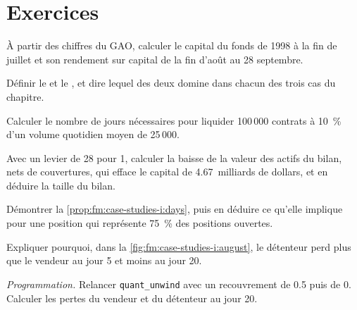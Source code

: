 \section{Exercices}

\begin{exercise}[$\star$]\label{exo:fm:case-studies-i:1}
À partir des chiffres du GAO, calculer le capital du fonds de 1998 à la fin de juillet et son rendement sur capital de la fin d'août au 28 septembre.
\end{exercise}

\begin{exercise}[$\star$]\label{exo:fm:case-studies-i:2}
Définir le  et le , et dire lequel des deux domine dans chacun des trois cas du chapitre.
\end{exercise}

\begin{exercise}[$\star$]\label{exo:fm:case-studies-i:3}
Calculer le nombre de jours nécessaires pour liquider 100\,000 contrats à 10~\% d'un volume quotidien moyen de 25\,000.
\end{exercise}

\begin{exercise}[$\star\star$]\label{exo:fm:case-studies-i:4}
Avec un levier de 28 pour 1, calculer la baisse de la valeur des actifs du bilan, nets de couvertures, qui efface le capital de 4.67~milliards de dollars, et
en déduire la taille du bilan.
\end{exercise}

\begin{exercise}[$\star\star$]\label{exo:fm:case-studies-i:5}
Démontrer la \cref{prop:fm:case-studies-i:days}, puis en déduire ce qu'elle implique pour une position qui représente 75~\% des positions ouvertes.
\end{exercise}

\begin{exercise}[$\star\star$]\label{exo:fm:case-studies-i:6}
Expliquer pourquoi, dans la \cref{fig:fm:case-studies-i:august}, le détenteur perd plus que le vendeur au jour 5 et moins au jour 20.
\end{exercise}

\begin{exercise}[$\star\star\star$]\label{exo:fm:case-studies-i:7}
\emph{Programmation.} Relancer \texttt{quant\_unwind} avec un recouvrement de 0.5 puis de 0. Calculer les pertes du vendeur et du détenteur au jour 20.
\end{exercise}

